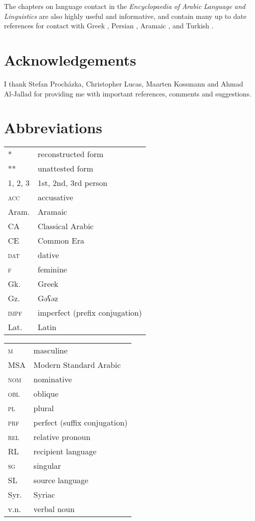 \documentclass[output=paper]{langsci/langscibook}
\begin{document}
The chapters on language contact in the \textit{Encyclopaedia} \textit{of} \textit{Arabic} \textit{Language} \textit{and} \textit{Linguistics} are also highly useful and informative, and contain many up to date references for contact with Greek \citep{Gutas2011}, Persian \citep{Asbaghi2011}, Aramaic \cite{Retsö2011}, and Turkish \citep{Procházka2011Turkish}.

\section*{Acknowledgements}
I thank Stefan Procházka, Christopher Lucas, Maarten Kossmann and Ahmad Al-Jallad for providing me with important references, comments and suggestions.

\section*{Abbreviations}
\begin{tabularx}{.5\textwidth}{@{}lQ@{}}
*             &  reconstructed form\\
**            &  unattested form\\
\textsc {1, 2, 3} & 1st, 2nd, 3rd person \\
\textsc{acc}  &  accusative\\
Aram.         &  Aramaic\\
CA            &  Classical Arabic\\
CE            &  Common Era\\
\textsc{dat}  &  dative\\
\textsc{f}    &  feminine\\
Gk.           &  Greek\\
Gz.           &  Gəʕəz\\
\textsc{impf} &  imperfect (prefix conjugation)\\
Lat.           &  Latin\\
\end{tabularx}%
\begin{tabularx}{.5\textwidth}{@{}lQ@{}}
\textsc{m}    &  masculine\\
MSA           &  Modern Standard Arabic\\
\textsc{nom}  &  nominative\\
\textsc{obl}  &  oblique\\
\textsc{pl}   &  plural\\
\textsc{prf}  &  perfect (suffix conjugation)\\
\textsc{rel}  &  relative pronoun\\
RL          &  recipient language\\
\textsc{sg}   &  singular\\
SL          &  source language\\
Syr.          &  Syriac\\
v.n.         &  verbal noun\\
\end{tabularx}%


{\sloppy\printbibliography[heading=subbibliography,notkeyword=this]}
\end{document}

